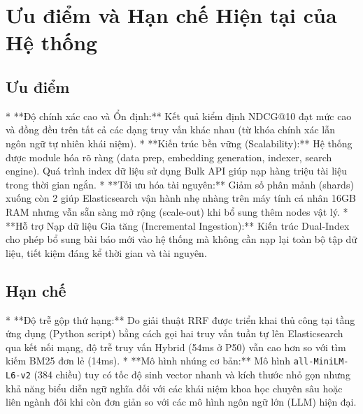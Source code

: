 \section{Ưu điểm và Hạn chế Hiện tại của Hệ thống}

\subsection{Ưu điểm}
* **Độ chính xác cao và Ổn định:** Kết quả kiểm định NDCG@10 đạt mức cao và đồng đều trên tất cả các dạng truy vấn khác nhau (từ khóa chính xác lẫn ngôn ngữ tự nhiên khái niệm).
* **Kiến trúc bền vững (Scalability):** Hệ thống được module hóa rõ ràng (data prep, embedding generation, indexer, search engine). Quá trình index dữ liệu sử dụng Bulk API giúp nạp hàng triệu tài liệu trong thời gian ngắn.
* **Tối ưu hóa tài nguyên:** Giảm số phân mảnh (shards) xuống còn 2 giúp Elasticsearch vận hành nhẹ nhàng trên máy tính cá nhân 16GB RAM nhưng vẫn sẵn sàng mở rộng (scale-out) khi bổ sung thêm nodes vật lý.
* **Hỗ trợ Nạp dữ liệu Gia tăng (Incremental Ingestion):** Kiến trúc Dual-Index cho phép bổ sung bài báo mới vào hệ thống mà không cần nạp lại toàn bộ tập dữ liệu, tiết kiệm đáng kể thời gian và tài nguyên.

\subsection{Hạn chế}
* **Độ trễ gộp thứ hạng:** Do giải thuật RRF được triển khai thủ công tại tầng ứng dụng (Python script) bằng cách gọi hai truy vấn tuần tự lên Elasticsearch qua kết nối mạng, độ trễ truy vấn Hybrid (54ms ở P50) vẫn cao hơn so với tìm kiếm BM25 đơn lẻ (14ms).
* **Mô hình nhúng cơ bản:** Mô hình \texttt{all-MiniLM-L6-v2} (384 chiều) tuy có tốc độ sinh vector nhanh và kích thước nhỏ gọn nhưng khả năng biểu diễn ngữ nghĩa đối với các khái niệm khoa học chuyên sâu hoặc liên ngành đôi khi còn đơn giản so với các mô hình ngôn ngữ lớn (LLM) hiện đại.

